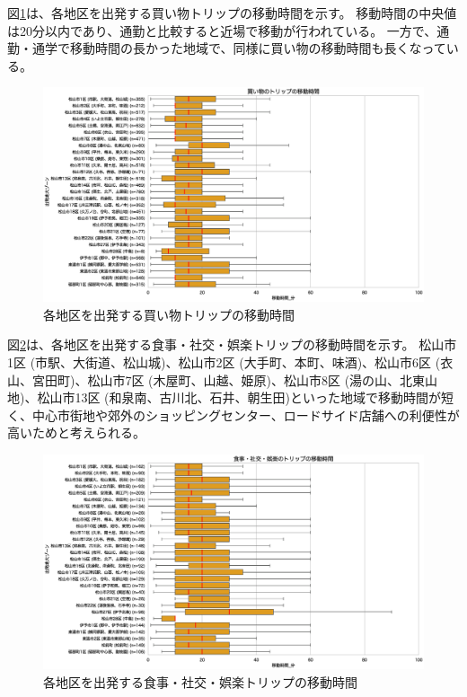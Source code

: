 \documentclass[a4paper,12pt, uplatex]{jsbook}
\begin{document}
図\ref{fig:time_shopping}は、各地区を出発する買い物トリップの移動時間を示す。
移動時間の中央値は20分以内であり、通勤と比較すると近場で移動が行われている。
一方で、通勤・通学で移動時間の長かった地域で、同様に買い物の移動時間も長くなっている。
%
\begin{figure}[H]
    \centering
    \includegraphics[width=1.0\textwidth]{picture/time_買い物.eps}
    \caption{各地区を出発する買い物トリップの移動時間}
    \label{fig:time_shopping}
\end{figure}

\clearpage
図\ref{fig:time_leisure}は、各地区を出発する食事・社交・娯楽トリップの移動時間を示す。
松山市1区 (市駅、大街道、松山城)、松山市2区 (大手町、本町、味酒)、松山市6区 (衣山、宮田町)、松山市7区 (木屋町、山越、姫原)、松山市8区 (湯の山、北東山地)、松山市13区 (和泉南、古川北、石井、朝生田)といった地域で移動時間が短く、中心市街地や郊外のショッピングセンター、ロードサイド店舗への利便性が高いためと考えられる。
%
\begin{figure}[H]
    \centering
    \includegraphics[width=1.0\textwidth]{picture/time_食事・社交・娯楽.eps}
    \caption{各地区を出発する食事・社交・娯楽トリップの移動時間}
    \label{fig:time_leisure}
\end{figure}
\end{document}
